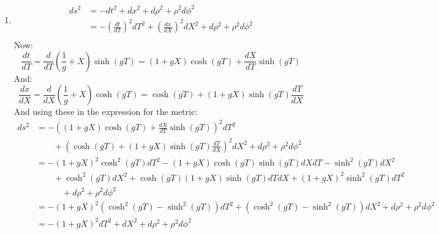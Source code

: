 \documentclass[12pt,a4]{article}
\begin{document}
\begin{enumerate}
\begin{enumerate}
\begin{figure}[H]
          \label{fig:partTrajectories}
        \end{figure}
      \item 
        \begin{align*}
          ds^2 &= -dt^2 + dx^2 + d\rho^2 + \rho^2d\phi^2\\
               &= -\left(\frac{dt}{dT}\right)^2dT^2 + \left(\frac{dx}{dX}\right)^2 dX^2 + d\rho^2 + \rho^2d\phi^2\\
        \end{align*}
        Now:
        \begin{equation*}
          \frac{d t}{dT} = \frac{d}{dT} \left(\frac{1}{g} + X\right) \sinh(gT) = \left(1 + gX\right) \cosh(gT) + \frac{d X}{dT} \sinh(gT)
        \end{equation*}
        And:
        \begin{equation*}
          \frac{d x}{dX} = \frac{d}{dX} \left(\frac{1}{g} + X\right) \cosh(gT) =  \cosh(gT) + \left(1 + gX\right) \sinh(gT) \frac{dT}{dX}
        \end{equation*}
        And using these in the expression for the metric:
        \begin{align*}
          ds^2  &= -\left(\left(1 + gX\right) \cosh(gT) + \frac{d X}{dT} \sinh(gT)\right)^2dT^2\\
                &\qquad + \left(\cosh(gT) + \left(1 + gX\right) \sinh(gT) \frac{dT}{dX}\right)^2 dX^2 + d\rho^2 + \rho^2d\phi^2\\
                &= -\left(1 + gX\right)^2 \cosh^2(gT)dT^2 - \left(1 + gX\right) \cosh(gT) \sinh(gT)dXdT - \sinh^2(gT) dX^2\\
                &\qquad + \cosh^2(gT)dX^2 + \cosh(gT)\left(1 + gX\right) \sinh(gT) dT dX + \left(1 + gX\right)^2 \sinh^2(gT) dT^2\\
                &\qquad \quad + d\rho^2 + \rho^2d\phi^2\\
                &= -\left(1 + gX\right)^2 (\cosh^2(gT) - \sinh^2(gT))dT^2  + (\cosh^2(gT) - \sinh^2(gT)) dX^2 + d\rho^2 + \rho^2d\phi^2\\
                &= -\left(1 + gX\right)^2 dT^2  +  dX^2 + d\rho^2 + \rho^2d\phi^2
        \end{align*}
    \end{enumerate}


\end{enumerate}
\end{document}
